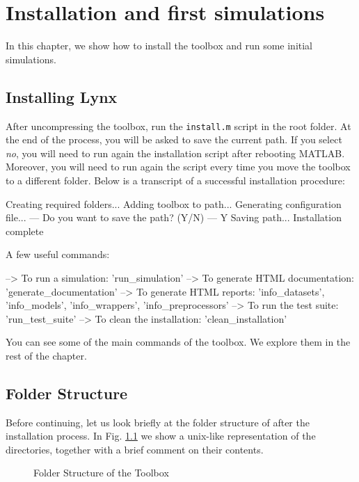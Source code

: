 \chapter{Installation and first simulations}
\label{chap:install}

In this chapter, we show how to install the toolbox and run some initial simulations.

\section{Installing Lynx}

After uncompressing the toolbox, run the \verb|install.m| script in the root folder. At the end of the process, you will be asked to save the current path. If you select \textit{no}, you will need to run again the installation script after rebooting MATLAB. Moreover, you will need to run again the script every time you move the toolbox to a different folder. Below is a transcript of a successful installation procedure:

\begin{console}
Creating required folders...
Adding toolbox to path...
Generating configuration file...
--- Do you want to save the path? (Y/N) ---
Y
Saving path...
Installation complete

A few useful commands:

   --> To run a simulation: 'run_simulation'
   --> To generate HTML documentation: 'generate_documentation'
   --> To generate HTML reports: 'info_datasets', 'info_models', 
      'info_wrappers', 'info_preprocessors'
   --> To run the test suite: 'run_test_suite'
   --> To clean the installation: 'clean_installation'
\end{console}

\noindent You can see some of the main commands of the toolbox. We explore them in the rest of the chapter.

\section{Folder Structure}
\label{sec:folders}

Before continuing, let us look briefly at the folder structure of \toolboxname after the installation process. In Fig. \ref{fig:folders} we show a unix-like representation of the directories, together with a brief comment on their contents.

\begin{figure}[h]
\label{fig:folders}
\caption{Folder Structure of the Toolbox}
\end{figure} 


